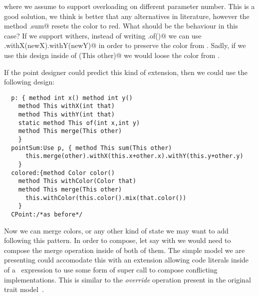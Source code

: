 where we assume to support overloading on different parameter number.
This is a good solution, we think is better that any alternatives in literature,
however the method \Q@CPoint.sum@ resets the color to red.
What should be the behaviour in this case?
If we support withers, instead of writing \Q@This.of()@ we can use
\Q@this.withX(newX).withY(newY)@ in order to preserve the color from \Q@this@.
Sadly, if we use this design inside of \Q@sum(This other)@ we would loose the color from \Q@other@.

If the point designer could predict this kind of extension, then we could use the following design:  
\begin{lstlisting}
  p: { method int x() method int y()
    method This withX(int that)
    method This withY(int that)
    static method This of(int x,int y)
    method This merge(This other)
    }
  pointSum:Use p, { method This sum(This other)
      this.merge(other).withX(this.x+other.x).withY(this.y+other.y)
    }
  colored:{method Color color()
    method This withColor(Color that)
    method This merge(This other)
      this.withColor(this.color().mix(that.color())
    }
  CPoint:/*as before*/
\end{lstlisting}  
  Now we can merge colors, or any other kind of state we may want to add
  following this pattern.
  In order to compose, let say \Q@colored@ with \Q@flavored@ we would
  need to compose the merge operation inside of both of them.
  The simple model we are presenting could accomodate this with an
  extension allowing code literals inside of a \use\ expression to use some form of super call to compose conflicting implementations. This is similar to the \emph{override} operation present in the original trait model~\cite{ducasse2006traits}.
  
